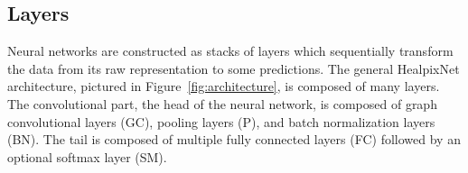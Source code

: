 \documentclass[final,twocolumn,3p,times,sort&compress]{elsarticle}
\newcommand{\figref}[1]{Figure~\ref{fig:#1}}
\renewcommand{\b}[1]{{\bm{#1}}}   %
\newcommand{\1}{\b{1}}              %
\newcommand{\0}{\b{0}}              %
\newcommand{\x}{\b{x}}
\newcommand{\y}{\b{y}}
\newcommand{\trans}{^\intercal}
\newcommand{\R}{\mathbb{R}}
\DeclareMathOperator*{\esp}{E}
\DeclareMathOperator*{\var}{Var}
\begin{document}
%

\subsection{Layers}

Neural networks are constructed as stacks of layers which sequentially transform the data from its raw representation to some predictions.
The general HealpixNet architecture, pictured in \figref{architecture}, is composed of many layers. The convolutional part, the head of the neural network, is composed of graph convolutional layers (GC), pooling layers (P), and batch normalization layers (BN). The tail is composed of multiple fully connected layers (FC) followed by an optional softmax layer (SM).
\end{document}
